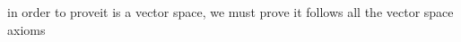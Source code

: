 \documentclass[preview]{standalone}
\begin{document}
\begin{center}
in order to proveit is a vector space, we must prove it follows all the vector space axioms
\end{center}
\end{document}

